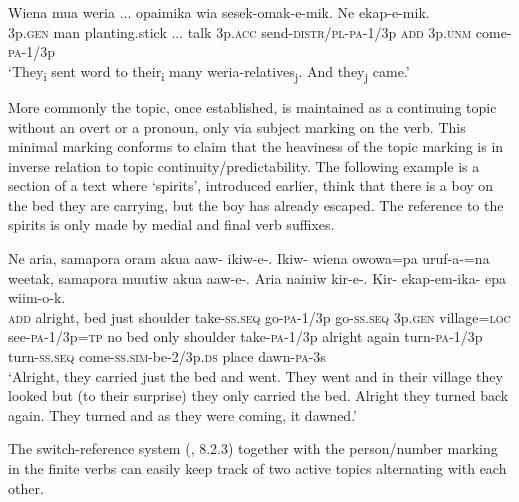 \ea%
\label{ex:x1868}
\gll Wiena  mua  weria  ...  opaimika  wia sesek-omak-e-mik.  Ne    ekap-e-mik. \\
3p.\textsc{gen}  man  planting.stick  ...  talk  3p.\textsc{acc} send-\textsc{distr}/\textsc{pl}-\textsc{pa}-1/3p  \textsc{add}  3p.\textsc{unm}  come-\textsc{pa}-1/3p     \\
\glt`They\textsubscript{i} sent word to their\textsubscript{i} many weria-relatives\textsubscript{j}. And they\textsubscript{j} came.' 
\z


More commonly the topic, once established, is maintained as a continuing topic without an overt  or a pronoun, only via subject marking on the verb. This minimal marking conforms to  claim that the heaviness of the topic marking is in inverse relation to topic continuity/predictability. The following example is a section of a text where  `spirits', introduced earlier, think that there is a boy on the bed they are carrying, but the boy has already escaped. The reference to the spirits is only made by medial and final verb suffixes. 

\ea%
\label{ex:x1675}
\gll Ne  aria,  samapora  oram  akua  aaw-  ikiw-e-. Ikiw-  wiena  owowa=pa  uruf-a-=na  weetak, samapora  muutiw  akua  aaw-e-. Aria  nainiw  kir-e-.  Kir-  ekap-em-ika- epa  wiim-o-k.\\
\textsc{add}  alright,  bed  just  shoulder  take-\textsc{ss}.\textsc{seq}  go-\textsc{pa}-1/3p go-\textsc{ss}.\textsc{seq}  3p.\textsc{gen}  village=\textsc{loc}  see-\textsc{pa}-1/3p=\textsc{tp}  no bed  only  shoulder  take-\textsc{pa}-1/3p alright  again  turn-\textsc{pa}-1/3p  turn-\textsc{ss}.\textsc{seq}  come-\textsc{ss}.\textsc{sim}-be-2/3p.\textsc{ds} place  dawn-\textsc{pa}-3s\\
\glt`Alright, they carried just the bed and went. They went and in their village they looked but (to their surprise) they only carried the bed. Alright they turned back again. They turned and as they were coming, it dawned.'
\z


The switch-reference system (, 8.2.3) together with the person/number marking in the finite verbs can easily keep track of two active topics alternating with each other. 

